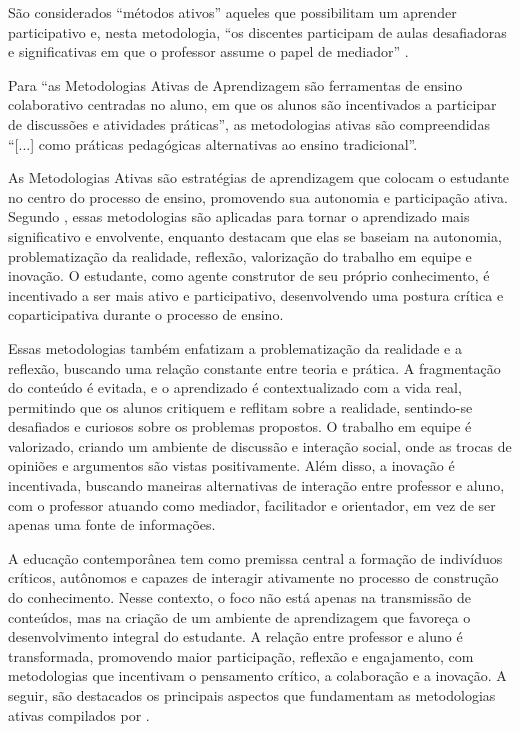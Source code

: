 São considerados ``métodos ativos'' aqueles que possibilitam um aprender participativo e, nesta metodologia, ``os discentes participam de aulas desafiadoras e significativas em que o professor assume o papel de mediador'' \cite[p. 56]{GOUVEIA2019}.

Para  ``as Metodologias Ativas de Aprendizagem são ferramentas de ensino colaborativo centradas no aluno, em que os alunos são incentivados a participar de discussões e atividades práticas'', as metodologias ativas são compreendidas ``[...] como práticas pedagógicas alternativas ao ensino tradicional''.

As Metodologias Ativas são estratégias de aprendizagem que colocam o estudante no centro do processo de ensino, promovendo sua autonomia e participação ativa. Segundo , essas metodologias são aplicadas para tornar o aprendizado mais significativo e envolvente, enquanto  destacam que elas se baseiam na autonomia, problematização da realidade, reflexão, valorização do trabalho em equipe e inovação. O estudante, como agente construtor de seu próprio conhecimento, é incentivado a ser mais ativo e participativo, desenvolvendo uma postura crítica e coparticipativa durante o processo de ensino.

Essas metodologias também enfatizam a problematização da realidade e a reflexão, buscando uma relação constante entre teoria e prática. A fragmentação do conteúdo é evitada, e o aprendizado é contextualizado com a vida real, permitindo que os alunos critiquem e reflitam sobre a realidade, sentindo-se desafiados e curiosos sobre os problemas propostos. O trabalho em equipe é valorizado, criando um ambiente de discussão e interação social, onde as trocas de opiniões e argumentos são vistas positivamente. Além disso, a inovação é incentivada, buscando maneiras alternativas de interação entre professor e aluno, com o professor atuando como mediador, facilitador e orientador, em vez de ser apenas uma fonte de informações.

A educação contemporânea tem como premissa central a formação de indivíduos críticos, autônomos e capazes de interagir ativamente no processo de construção do conhecimento. Nesse contexto, o foco não está apenas na transmissão de conteúdos, mas na criação de um ambiente de aprendizagem que favoreça o desenvolvimento integral do estudante. A relação entre professor e aluno é transformada, promovendo maior participação, reflexão e engajamento, com metodologias que incentivam o pensamento crítico, a colaboração e a inovação. A seguir, são destacados os principais aspectos que fundamentam as metodologias ativas compilados por .

